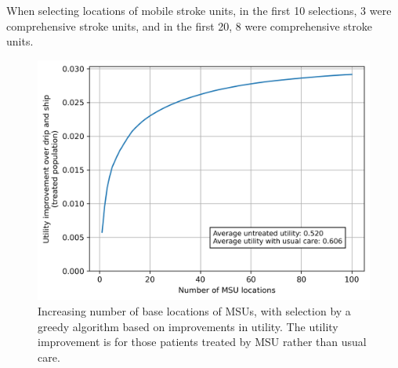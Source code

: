 When selecting locations of mobile stroke units, in the first 10 selections, 3 were comprehensive stroke units, and in the first 20, 8 were comprehensive stroke units.

\begin{figure}[h]
    \centering
    \includegraphics[width=0.5\linewidth]{images/msu_advantages_greedy.png}
    \caption{Increasing number of base locations of MSUs, with selection by a greedy algorithm based on improvements in utility. The utility improvement is for those patients treated by MSU rather than usual care.}
    \label{fig:greedy}
\end{figure}


